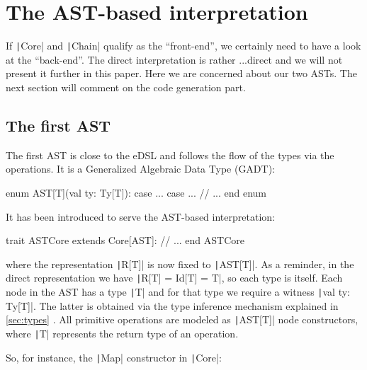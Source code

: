 \documentclass[11pt]{article}
\renewcommand{\vref}[1]{\autoref{#1} \vpageref{#1}}{}
\newcommand{\ScalaI}[1]{\texttt|#1|}
\begin{document}
\section{The AST-based interpretation}
\label{sec:ast}
If \ScalaI{Core} and \ScalaI{Chain} qualify as the ``front-end'', we certainly need to have a look at the ``back-end''. The direct interpretation is rather ...direct and we will not present it further in this paper. Here we are concerned about our two ASTs. The next section will comment on the code generation part.

  \subsection{The first AST}

The first AST  is close to the eDSL and follows the flow of the types via the operations. It is a Generalized Algebraic Data Type (GADT):

\begin{ScalaBlockSimple}
enum AST[T](val ty: Ty[T]):
  case ...
  case ...
  // ...
end enum
\end{ScalaBlockSimple}

\noindent It has been introduced to serve the AST-based interpretation:

\begin{ScalaBlockSimple}
trait ASTCore extends Core[AST]:
  // ...
end ASTCore
\end{ScalaBlockSimple}

\noindent where the representation \ScalaI{R[T]} is now fixed to \ScalaI{AST[T]}. As a reminder, in the direct representation we have \ScalaI{R[T] = Id[T] = T}, so each type is itself. Each node in the AST has a type \ScalaI{T} and for that type we require a witness \ScalaI{val ty: Ty[T]}. The latter is obtained via the type inference mechanism explained in \vref{sec:types}. All primitive operations are modeled as \ScalaI{AST[T]} node constructors, where \ScalaI{T} represents the return type of an operation.

So, for instance, the \ScalaI{Map} constructor in \ScalaI{Core}:
\end{document}
